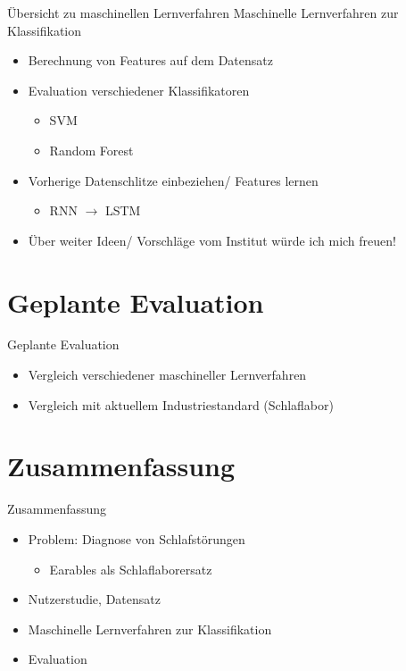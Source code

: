 \documentclass[18pt]{beamer}
\begin{document}
\begin{frame}{Übersicht zu maschinellen Lernverfahren}
	Maschinelle Lernverfahren zur Klassifikation
	\begin{itemize}
		\item Berechnung von Features auf dem Datensatz
		\item Evaluation verschiedener Klassifikatoren
		\begin{itemize}
			\item SVM
			\item Random Forest
		\end{itemize}
		\item Vorherige Datenschlitze einbeziehen/ Features lernen
		\begin{itemize}
			\item RNN $\rightarrow$ LSTM
		\end{itemize}
		\item Über weiter Ideen/ Vorschläge vom Institut würde ich mich freuen!
	\end{itemize}
\end{frame}


\section{Geplante Evaluation}
\begin{frame}{Geplante Evaluation}
\begin{itemize}
	\item Vergleich verschiedener maschineller Lernverfahren
	\item Vergleich mit aktuellem Industriestandard (Schlaflabor)
\end{itemize}
\end{frame}

\section{Zusammenfassung}
\begin{frame}{Zusammenfassung}
	\begin{itemize}
		\item Problem: Diagnose von Schlafstörungen
		\begin{itemize}
			\item Earables als Schlaflaborersatz
		\end{itemize}
		\item Nutzerstudie, Datensatz
		\item Maschinelle Lernverfahren zur Klassifikation
		\item Evaluation
	\end{itemize}
\end{frame}
\end{document}
